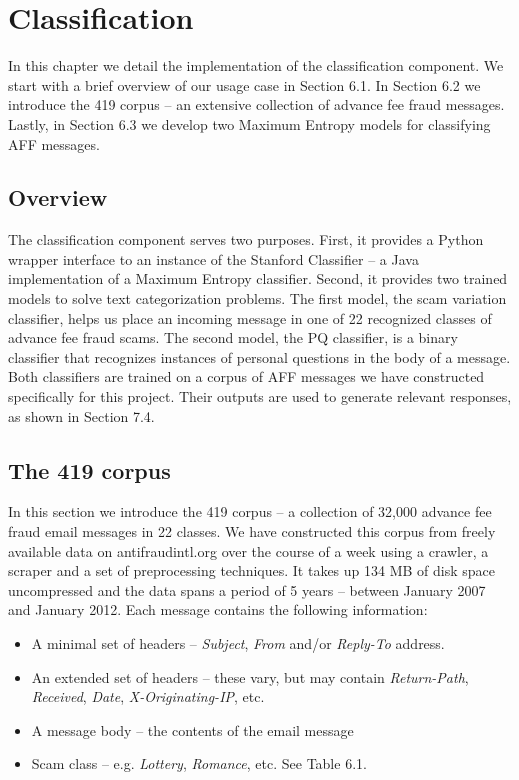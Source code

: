 \chapter{Classification}
In this chapter we detail the implementation of the classification component. We start with a brief overview of our usage case in Section 6.1. In Section 6.2 we introduce the 419 corpus -- an extensive collection of advance fee fraud messages. Lastly, in Section 6.3 we develop two Maximum Entropy models for classifying AFF messages.

\section{Overview}
The classification component serves two purposes. First, it provides a Python wrapper interface to an instance of the Stanford Classifier \cite{P13} -- a Java implementation of a Maximum Entropy classifier. Second, it provides two trained models to solve text categorization problems. The first model, the scam variation classifier, helps us place an incoming message in one of 22 recognized classes of advance fee fraud scams. The second model, the PQ classifier, is a binary classifier that recognizes instances of personal questions in the body of a message. Both classifiers are trained on a corpus of AFF messages we have constructed specifically for this project. Their outputs are used to generate relevant responses, as shown in Section 7.4.

\section{The 419 corpus}
In this section we introduce the 419 corpus -- a collection of 32,000 advance fee fraud email messages in 22 classes. We have constructed this corpus from freely available data on antifraudintl.org over the course of a week using a crawler, a scraper and a set of preprocessing techniques. It takes up 134 MB of disk space uncompressed and the data spans a period of 5 years -- between January 2007 and January 2012.  Each message contains the following information:
\begin{itemize}
	\item A minimal set of headers -- \emph{Subject}, \emph{From} and/or \emph{Reply-To} address.
	\item An extended set of headers -- these vary, but may contain \emph{Return-Path}, \emph{Received}, \emph{Date}, \emph{X-Originating-IP}, etc.
	\item A message body -- the contents of the email message
	\item Scam class -- e.g. \emph{Lottery}, \emph{Romance}, etc. See Table 6.1.
\end{itemize}

